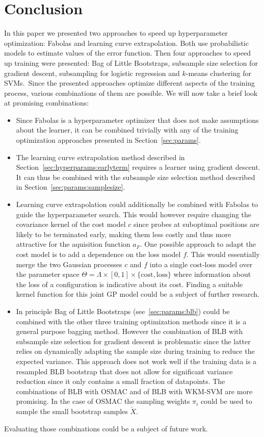 \section{Conclusion}%
\label{sec:conclusion}

In this paper we presented two approaches to speed up hyperparameter optimization: Fabolas and learning curve extrapolation.
Both use probabilistic models to estimate values of the error function.
Then four approaches to speed up training were presented: Bag of Little Bootstraps, subsample size selection for gradient descent, subsampling for logistic regression and \(k\)-means clustering for SVMs.\
Since the presented approaches optimize different aspects of the training process, various combinations of them are possible.
We will now take a brief look at promising combinations:
\begin{itemize}
	\item Since Fabolas is a hyperparameter optimizer that does not make assumptions about the learner, it can be combined trivially with any of the training optimization approaches presented in Section~\ref{sec:params}.
	\item The learning curve extrapolation method described in Section~\ref{sec:hyperparams:earlyterm} requires a learner using gradient descent.
		It can thus be combined with the subsample size selection method described in Section~\ref{sec:params:samplesize}.
	\item Learning curve extrapolation could additionally be combined with Fabolas to guide the hyperparameter search.
		This would however require changing the covariance kernel of the cost model \(c\) since probes at suboptimal positions are likely to be terminated early, making them less costly and thus more attractive for the aquisition function \(a_F\).
		One possible approach to adapt the cost model is to add a dependence on the loss model \(f\).
		This would essentially merge the two Gaussian processes \(c\) and \(f\) into a single cost-loss model over the parameter space \(\Theta = \Lambda \times [0, 1] \times \{\mathrm{cost}, \mathrm{loss}\}\) where information about the loss of a configuration is indicative about its cost.
		Finding a suitable kernel function for this joint GP model could be a subject of further research.
	\item In principle Bag of Little Bootstraps (see~\ref{sec:params:blb}) could be combined with the other three training optimization methods since it is a general purpose bagging method.
		However the combination of BLB with subsample size selection for gradient descent is problematic since the latter relies on dynamically adapting the sample size during training to reduce the expected variance.
		This approach does not work well if the training data is a resampled BLB bootstrap that does not allow for significant variance reduction since it only contains a small fraction of datapoints.
		The combinations of BLB with OSMAC and of BLB with WKM-SVM are more promising.
		In the case of OSMAC the sampling weights \(\pi_i\) could be used to sample the small bootstrap samples \(\check{X}\).
\end{itemize}
Evaluating those combinations could be a subject of future work.
